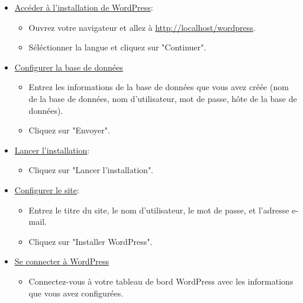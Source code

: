 \documentclass[a4paper,11pt]{article}
\begin{document}
\begin{enumerate}
\begin{itemize}
                                \item \underline{Accéder à l'installation de WordPress}:
                                    \begin{itemize}
                                        \item Ouvrez votre navigateur et allez à \url{http://localhost/wordpress}.
                                        \item Séléctionner la langue et cliquez sur "Continuer".
                                    \end{itemize}
                                \item \underline{Configurer la base de données}
                                    \begin{itemize}
                                        \item Entrez les informations de la base de données que vous avez créée (nom de la base de données, nom d'utilisateur, mot de passe, hôte de la base de données).
                                        \item Cliquez sur "Envoyer".
                                    \end{itemize}
                                \item \underline{Lancer l'installation}:
                                    \begin{itemize}
                                        \item Cliquez sur "Lancer l'installation".
                                    \end{itemize}
                                \item \underline{Configurer le site}:
                                    \begin{itemize}
                                        \item Entrez le titre du site, le nom d'utilisateur, le mot de passe, et l'adresse e-mail.
                                        \item Cliquez sur "Installer WordPress".
                                    \end{itemize}
                                \item \underline{Se connecter à WordPress}
                                    \begin{itemize}
                                        \item Connectez-vous à votre tableau de bord WordPress avec les informations que vous avez configurées.
                                    \end{itemize}
                            

\end{itemize}
\end{enumerate}
\end{document}
